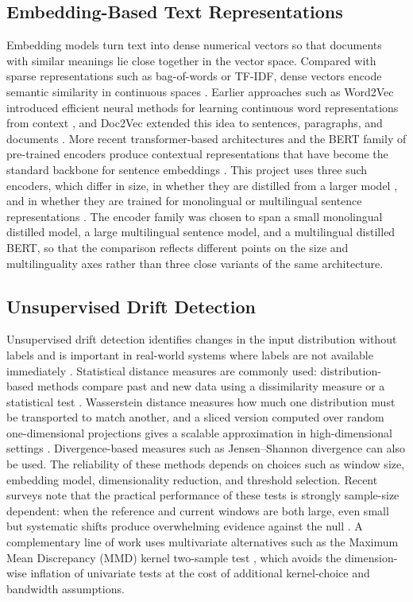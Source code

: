 \documentclass[conference]{IEEEtran}
\begin{document}
\subsection{Embedding-Based Text Representations}

Embedding models turn text into dense numerical vectors so that documents with similar meanings lie close together in the vector space. Compared with sparse representations such as bag-of-words or TF-IDF, dense vectors encode semantic similarity in continuous spaces \cite{mikolov2013,le2014}. Earlier approaches such as Word2Vec introduced efficient neural methods for learning continuous word representations from context \cite{mikolov2013}, and Doc2Vec extended this idea to sentences, paragraphs, and documents \cite{le2014}. More recent transformer-based architectures \cite{vaswani2017} and the BERT family of pre-trained encoders \cite{devlin2019} produce contextual representations that have become the standard backbone for sentence embeddings \cite{reimers2019}. This project uses three such encoders, which differ in size, in whether they are distilled from a larger model \cite{sanh2019}, and in whether they are trained for monolingual or multilingual sentence representations \cite{feng2020}. The encoder family was chosen to span a small monolingual distilled model, a large multilingual sentence model, and a multilingual distilled BERT, so that the comparison reflects different points on the size and multilinguality axes rather than three close variants of the same architecture.

\subsection{Unsupervised Drift Detection}

Unsupervised drift detection identifies changes in the input distribution without labels and is important in real-world systems where labels are not available immediately \cite{abghani2020,demello2019}. Statistical distance measures are commonly used: distribution-based methods compare past and new data using a dissimilarity measure or a statistical test \cite{lu2018}. Wasserstein distance measures how much one distribution must be transported to match another, and a sliced version computed over random one-dimensional projections gives a scalable approximation in high-dimensional settings \cite{bonneel2015}. Divergence-based measures such as Jensen--Shannon divergence can also be used. The reliability of these methods depends on choices such as window size, embedding model, dimensionality reduction, and threshold selection. Recent surveys note that the practical performance of these tests is strongly sample-size dependent: when the reference and current windows are both large, even small but systematic shifts produce overwhelming evidence against the null \cite{lu2018,bayram2022}. A complementary line of work uses multivariate alternatives such as the Maximum Mean Discrepancy (MMD) kernel two-sample test \cite{gretton2012}, which avoids the dimension-wise inflation of univariate tests at the cost of additional kernel-choice and bandwidth assumptions.
\end{document}

